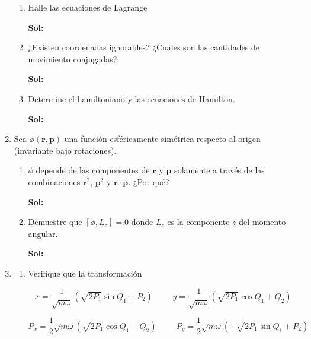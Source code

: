 \documentclass[12pt,a4paper]{article}
\begin{document}
\begin{enumerate}
\begin{enumerate}
    \item Halle las ecuaciones de Lagrange
    
    \textbf{Sol:}
    
    \item ¿Existen coordenadas ignorables? ¿Cuáles son las cantidades de movimiento conjugadas?
    
    \textbf{Sol:}
    
    \item Determine el hamiltoniano y las ecuaciones de Hamilton.
    
    \textbf{Sol:}
    
\end{enumerate}






\item Sea $\phi (\mathbf{r}, \mathbf{p})$ una función esféricamente simétrica respecto al origen (invariante bajo rotaciones).

\begin{enumerate}
    \item $\phi$ depende de las componentes de $\mathbf{r}$ y $\mathbf{p}$ solamente a través de las combinaciones $\mathbf{r}^2$, $\mathbf{p}^2$ y $\mathbf{r}\cdot \mathbf{p}$. ¿Por qué?
    
    \textbf{Sol:}
    
    \item Demuestre que $[\phi, L_z] = 0$ donde $L_z$ es la componente $z$ del momento angular.
    
    \textbf{Sol:}
\end{enumerate}






\item \begin{enumerate}
    \item Verifique que la transformación 
    
    \begin{equation*}
        x = \frac{1}{\sqrt{m\omega}} (\sqrt{2P_1}\sin{Q_1} + P_2) \hspace{1cm} y = \frac{1}{\sqrt{m\omega}} (\sqrt{2P_1} \cos{Q_1} + Q_2)
    \end{equation*}
    
    \begin{equation*}
        P_x = \frac{1}{2} \sqrt{m \omega} (\sqrt{2P_1} \cos{Q_1} - Q_2) \hspace{1cm} P_y = \frac{1}{2}\sqrt{m \omega} (- \sqrt{2P_1}\sin{Q_1} + P_2)
    \end{equation*}
    

\end{enumerate}
\end{enumerate}
\end{document}
